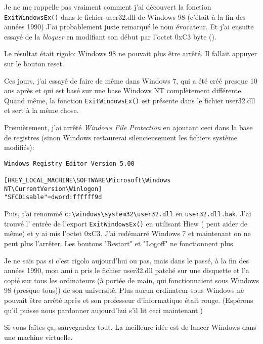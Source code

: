 
Je ne me rappelle pas vraiment comment j'ai découvert la fonction \verb|ExitWindowsEx()|
dans le fichier user32.dll de Windows 98 (c'était à la fin des années 1990)
J'ai probablement juste remarqué le nom évocateur.
Et j'ai ensuite essayé de la \emph{bloquer} en modifiant son début par l'octet 0xC3 byte ().

Le résultat était rigolo: Windows 98 ne pouvait plus être arrêté.
Il fallait appuyer sur le bouton reset.

Ces jours, j'ai essayé de faire de même dans Windows 7, qui a été créé presque
10 ans après et qui est basé sur une base Windows NT complètement différente.
Quand même, la fonction \verb|ExitWindowsEx()| est présente dans le fichier
user32.dll et sert à la même chose.

Premièrement, j'ai arrêté \emph{Windows File Protection} en ajoutant ceci dans la
base de registres (sinon Windows restaurerai silencieusement les fichiers système
modifiés):

\begin{lstlisting}
Windows Registry Editor Version 5.00

[HKEY_LOCAL_MACHINE\SOFTWARE\Microsoft\Windows NT\CurrentVersion\Winlogon]
"SFCDisable"=dword:ffffff9d
\end{lstlisting}

Puis, j'ai renommé \verb|c:\windows\system32\user32.dll| en \verb|user32.dll.bak|.
J'ai trouvé l' entrée de l'export \verb|ExitWindowsEx()| en utilisant Hiew (\IDA
peut aider de même) et y ai mis l'octet 0xC3.
J'ai redémarré Windows 7 et maintenant on ne peut plus l'arrêter.
Les boutons "Restart" et "Logoff" ne fonctionnent plus.

Je ne sais pas si c'est rigolo aujourd'hui ou pas, mais dans le passé, à la fin
des années 1990, mon ami a pris le fichier user32.dll patché sur une disquette
et l'a copié sur tous les ordinateurs (à portée de main, qui fonctionnaient sous
Windows 98 (presque tous)) de son université.
Plus aucun ordinateur sous Windows ne pouvait être arrêté après et son professeur
d'informatique était rouge.
(Espérons qu'il puisse nous pardonner aujourd'hui s'il lit ceci maintenant.)

Si vous faîtes ça, sauvegardez tout.
La meilleure idée est de lancer Windows dans une machine virtuelle.

